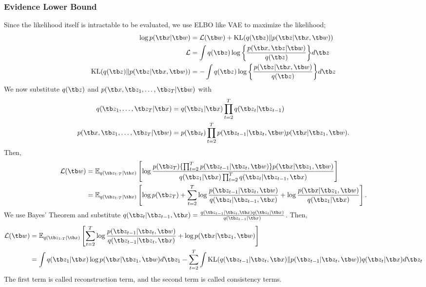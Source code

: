 \documentclass{article}
\begin{document}
        \subsubsection{Evidence Lower Bound}
            Since the likelihood itself is intractable to be evaluated, we use ELBO like VAE to maximize the likelihood;
            \begin{align*}
                \log{p(\tb x|\tb w)}
                &=\mathcal{L}(\tb w) + \text{KL}(q(\tb z)\|p(\tb z|\tb x,\tb w))
            \\  \mathcal{L}
                &=\int q(\tb z)\log{\left\{ \frac{p(\tb x, \tb z|\tb w)}{q(\tb z)} \right\}}d\tb z
            \\  \text{KL}(q(\tb z)\|p(\tb z|\tb x,\tb w))
                &=-\int q(\tb z)\log{\left\{ \frac{p(\tb z|\tb x,\tb w)}{q(\tb z)} \right\}}d\tb z
            \end{align*}
            We now substitute $q(\tb z)$ and $p(\tb x,\tb z_1,\dots,\tb z_T|\tb w)$
            with
            \begin{align*}
                q(\tb z_1,\dots,\tb z_T|\tb x) &= q(\tb z_1|\tb x)\prod_{t=2}^{T}q(\tb z_t|\tb z_{t-1})
            \\  p(\tb x,\tb z_1,\dots,\tb z_T|\tb w) &= p(\tb z_t)\prod_{t=2}^{T}p(\tb z_{t-1}|\tb z_t,\tb w)p(\tb x|\tb z_1,\tb w).
            \end{align*}
            Then,
            \begin{align*}
                \mathcal{L}(\tb w)
                &= \mathbb{E}_{q(\tb z_{1:T}|\tb x)}\left[ \log{\frac{p(\tb z_T)\{\prod_{t=2}^{T}p(\tb z_{t-1}|\tb z_t,\tb w)\}p(\tb x|\tb z_1, \tb w)}{q(\tb z_1 |\tb x)\prod_{t=2}^{T}q(\tb z_t|\tb z_{t-1},\tb x)}} \right]
            \\  &= \mathbb{E}_{q(\tb z_{1:T}|\tb x)}\left[ \log{p(\tb z_T)} + \sum_{t=2}^{T}\log{\frac{p(\tb z_{t-1}|\tb z_t,\tb w)}{q(\tb z_t|\tb z_{t-1},\tb x)}} + \log{\frac{p(\tb x|\tb z_1,\tb w)}{q(\tb z_1|\tb x)}} \right].
            \end{align*}
            We use Bayes' Theorem and substitute $q(\tb z_t|\tb z_{t-1}, \tb x) = \frac{q(\tb z_{t-1}|\tb z_t, \tb x)q(\tb z_t|\tb x)}{q(\tb z_{t-1}|\tb x)}$.
            Then,
            \begin{align*}
                \mathcal{L}(\tb w)
                &= \mathbb{E}_{q(\tb z_{1:T}|\tb x)}\left[\sum_{t=2}^{T}\log{\frac{p(\tb z_{t-1}|\tb z_t,\tb w)}{q(\tb z_{t-1}|\tb z_t, \tb x)}} + \log{p(\tb x|\tb z_1, \tb w)} \right]
            \\  &= \int q(\tb z_1|\tb x)\log{p(\tb x|\tb z_1,\tb w)}d\tb z_1 - \sum_{t=2}^{T}\int \text{KL}(q(\tb z_{t-1}|\tb z_t,\tb x)\|p(\tb z_{t-1}|\tb z_t,\tb w))q(\tb z_t|\tb x)d\tb z_t
            \end{align*}
            The first term is called reconstruction term, and the second term is called consistency terms.
\end{document}
